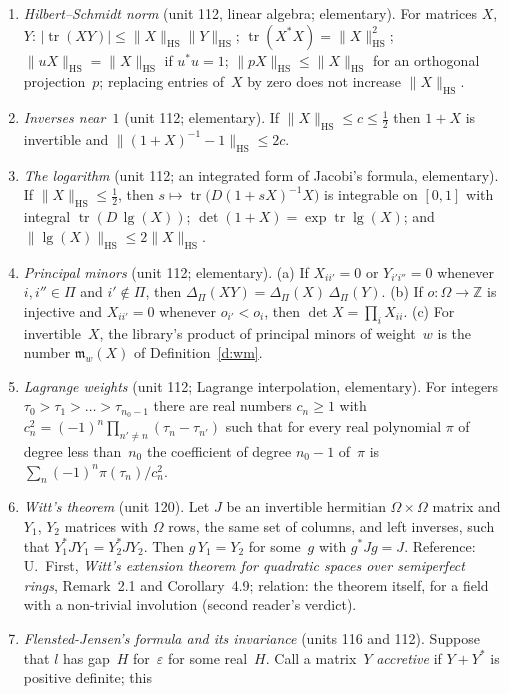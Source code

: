 \documentclass[11pt,a4paper]{article}
\newcommand{\kw}[1]{\emph{#1}}
\newcommand{\m}[1]{\mbox{$#1$}}        %
\theoremstyle{plainx}
\theoremstyle{uprightx}
\newcommand{\ZZ}{\mathbb{Z}}
\newcommand{\abs}[1]{\lvert #1\rvert}
\newcommand{\hs}[1]{\lVert #1\rVert_{\mathrm{HS}}}
\newcommand{\tr}{\operatorname{tr}}
\newcommand{\lgo}[1]{\operatorname{lg}(#1)}              %
\newcommand{\pmn}[2]{\Delta_{#1}(#2)}                    %
\newcommand{\wm}[2]{\mathfrak{m}_{#1}(#2)}               %
\begin{document}
\begin{enumerate}[label=\textup{(I\arabic*)},leftmargin=2.7em,itemsep=2.5pt]
\item \emph{Hilbert--Schmidt norm} (unit 112, linear algebra; elementary). For matrices $X$, $Y$:
  $\abs{\tr(XY)}\le\hs{X}\hs{Y}$; $\tr(X^{*}X)=\hs{X}^{2}$; \m{\hs{uX}=\hs{X}} if \m{u^{*}u=1}; \m{\hs{pX}\le\hs{X}} for an
  orthogonal projection~$p$;
  replacing entries of~$X$ by zero does not increase $\hs{X}$.
\item \emph{Inverses near~$1$} (unit 112; elementary). If \m{\hs{X}\le c\le\tfrac12} then \m{1+X} is invertible and
  \m{\hs{(1+X)^{-1}-1}\le2c}.
\item \emph{The logarithm} (unit 112; an integrated form of Jacobi's formula, elementary). If \m{\hs{X}\le\tfrac12},
  then $s\mapsto\tr\bigl(D(1+sX)^{-1}X\bigr)$ is integrable on $[0,1]$ with integral \m{\tr(D\,\lgo{X})};
  \m{\det(1+X)=\exp\tr\lgo{X}}; and \m{\hs{\lgo{X}}\le2\hs{X}}.
\item \emph{Principal minors} (unit 112; elementary). (a) If \m{X_{ii'}=0} or \m{Y_{i'i''}=0} whenever \m{i,i''\in\Pi}
  and \m{i'\notin\Pi}, then $\pmn{\Pi}{XY}=\pmn{\Pi}{X}\,\pmn{\Pi}{Y}$. (b) If \m{o\colon\Omega\to\ZZ} is injective
  and \m{X_{ii'}=0} whenever \m{o_{i'}<o_i}, then \m{\det X=\prod_iX_{ii}}. (c) For invertible~$X$, the library's
  product of principal minors of weight~$w$ is the number $\wm{w}{X}$ of Definition~\ref{d:wm}.
\item \emph{Lagrange weights} (unit 112; Lagrange interpolation, elementary). For integers
  $\tau_0>\tau_1>\dots>\tau_{n_0-1}$ there are real numbers \m{c_n\ge1} with
  $c_n^{2}=(-1)^{n}\prod_{n'\ne n}(\tau_n-\tau_{n'})$ such that for every real polynomial $\pi$ of degree less
  than~$n_0$ the coefficient of degree \m{n_0-1} of~$\pi$ is $\sum_n(-1)^{n}\pi(\tau_n)/c_n^{2}$.
\item \emph{Witt's theorem} (unit 120). Let $J$ be an invertible hermitian \m{\Omega\times\Omega} matrix and $Y_1$, $Y_2$
  matrices with $\Omega$ rows, the same set of columns, and left inverses, such that \m{Y_1^{*}JY_1=Y_2^{*}JY_2}. Then
  \m{g\,Y_1=Y_2} for some~$g$ with \m{g^{*}Jg=J}. Reference: U.~First, \emph{Witt's extension theorem for quadratic
  spaces over semiperfect rings}, Remark~2.1 and Corollary~4.9; relation: the theorem itself, for a field with a
  non-trivial involution (second reader's verdict).
\item \emph{Flensted-Jensen's formula and its invariance} (units 116 and 112). Suppose that $l$ has gap~$H$
  for~$\varepsilon$ for some real~$H$. Call a matrix~$Y$ \kw{accretive} if \m{Y+Y^{*}} is positive definite; this

\end{enumerate}
\end{document}
